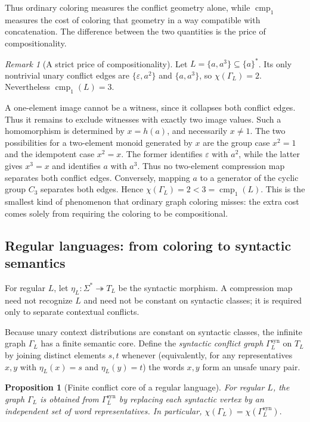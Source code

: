 \documentclass[10pt,a4paper]{article}
\newtheorem{proposition}[theorem]{Proposition}
\theoremstyle{definition}
\theoremstyle{remark}
\newtheorem{remark}[theorem]{Remark}
\newcommand{\cmp}{\operatorname{cmp}}
\begin{document}
Thus ordinary coloring measures the conflict geometry alone, while
\(\cmp_1\) measures the cost of coloring that geometry in a way compatible
with concatenation. The difference between the two quantities is the price of
compositionality.

\begin{remark}[A strict price of compositionality]
\label{conf:rem:strict-price}
Let \(L=\{a,a^3\}\subseteq\{a\}^*\).  Its only nontrivial unary conflict
edges are \(\{\varepsilon,a^2\}\) and \(\{a,a^3\}\), so
\(\chi(\Gamma_L)=2\).  Nevertheless \(\cmp_1(L)=3\).

A one-element image cannot be a witness, since it collapses both conflict
edges.  Thus it remains to exclude witnesses with exactly two image values.
Such a homomorphism is determined by \(x=h(a)\), and necessarily
\(x\ne1\).  The two possibilities for a two-element monoid generated by
\(x\) are the group case \(x^2=1\) and the idempotent case \(x^2=x\).
The former identifies \(\varepsilon\) with \(a^2\), while the latter gives
\(x^3=x\) and identifies \(a\) with \(a^3\).  Thus no two-element
compression map separates both conflict edges.  Conversely, mapping \(a\) to a
generator of the cyclic group \(C_3\) separates both edges.  Hence
\(\chi(\Gamma_L)=2<3=\cmp_1(L).\)
This is the smallest kind of phenomenon that ordinary graph coloring misses:
the extra cost comes solely from requiring the coloring to be compositional.
\end{remark}

\subsection{Regular languages: from coloring to syntactic semantics}

For regular \(L\), let \(\eta_L:\Sigma^*\twoheadrightarrow T_L\) be the syntactic morphism. A compression map need not recognize \(L\) and need
not be constant on syntactic classes; it is required only to separate
contextual conflicts.

Because unary context distributions are constant on syntactic classes, the
infinite graph \(\Gamma_L\) has a finite semantic core. Define the
\emph{syntactic conflict graph} \(\Gamma_L^{\mathrm{syn}}\) on \(T_L\) by
joining distinct elements \(s,t\) whenever (equivalently, for any
representatives \(x,y\) with \(\eta_L(x)=s\) and \(\eta_L(y)=t\)) the
words \(x,y\) form an unsafe unary pair.

\begin{proposition}[Finite conflict core of a regular language]
\label{conf:prop:syntactic-conflict-graph}
For regular \(L\), the graph \(\Gamma_L\) is obtained from
\(\Gamma_L^{\mathrm{syn}}\) by replacing each syntactic vertex by an
independent set of word representatives. In particular, \(\chi(\Gamma_L)=\chi(\Gamma_L^{\mathrm{syn}}).\) \end{proposition}
\end{document}
